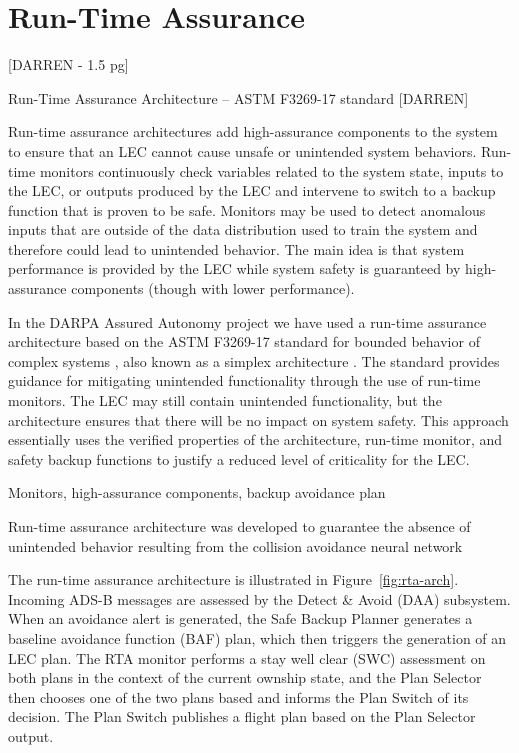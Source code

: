 \section{Run-Time Assurance}

[DARREN - 1.5 pg]

Run-Time Assurance Architecture -- ASTM F3269-17 standard [DARREN]

Run-time assurance architectures add high-assurance components
to the system to ensure that an LEC cannot cause
unsafe or unintended system behaviors. Run-time monitors
continuously check variables related to the system state, inputs
to the LEC, or outputs produced by the LEC and intervene to
switch to a backup function that is proven to be safe. Monitors
may be used to detect anomalous inputs that are outside of the
data distribution used to train the system and therefore could
lead to unintended behavior. The main idea is that system
performance is provided by the LEC while system safety is
guaranteed by high-assurance components (though with lower
performance).

In the DARPA Assured Autonomy project we have used a
run-time assurance architecture based on the ASTM F3269-17
standard for bounded behavior of complex systems \cite{F3269-17}, also
known as a simplex architecture \cite{simplex}. The standard provides
guidance for mitigating unintended functionality through the
use of run-time monitors. The LEC may still contain unintended
functionality, but the architecture ensures that there will
be no impact on system safety. This approach essentially uses
the verified properties of the architecture, run-time monitor,
and safety backup functions to justify a reduced level of
criticality for the LEC.

Monitors, high-assurance components, backup avoidance plan

Run-time assurance architecture was developed to guarantee the absence of unintended behavior resulting from the collision avoidance neural network


The run-time assurance architecture is illustrated in Figure~\ref{fig:rta-arch}.  Incoming ADS-B messages are assessed by the Detect \& Avoid (DAA) subsystem.  When an avoidance alert is generated, the Safe Backup Planner generates a baseline avoidance function (BAF) plan, which then triggers the generation of an LEC plan.  The RTA monitor performs a stay well clear (SWC) assessment on both plans in the context of the current ownship state, and the Plan Selector then chooses one of the two plans based and informs the Plan Switch of its decision.
The Plan Switch publishes a flight plan based on the Plan Selector output.

